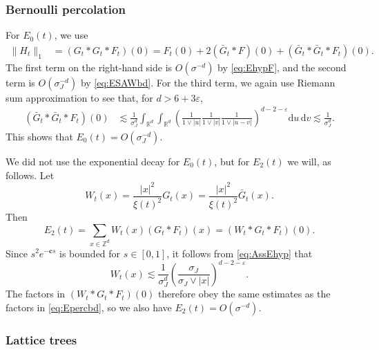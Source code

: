 \documentclass[11pt,a4paper]{article}
\numberwithin{equation}{section}
\theoremstyle{plain}
\theoremstyle{definition}
\newcommand\1{\mathds{1}}
\newcommand\bfc{\mathbf{c}}
\begin{document}
\subsubsection{Bernoulli percolation}

For $E_0(t)$, we use
\begin{align}
    \|H_t\|_1 & = (G_t*G_t*F_t)(0) = F_t(0) + 2(\bar G_t*F)(0) + (\bar G_t*\bar G_t*F_t)(0).
\end{align}
The first term on the right-hand side is $O(\sigma^{-d})$ by \eqref{eq:EhypF},
and the second term  is $O(\sigma_J^{-d})$ by \eqref{eq:ESAWbd}.  For the third
term, we again use Riemann sum approximation to see that,
for $d>6+3\varepsilon$,
\begin{align}
\label{eq:Epercbd}
    (\bar G_t* \bar G_t* F_t) (0)
    & \lesssim
    \frac{1}{\sigma_J^d}
    \int_{\mathbb R^d} \int_{\mathbb R^d}\left(
    \frac{1}{1\vee |u|}
    \frac{1}{1\vee |v|}
    \frac{1}{1\vee |u-v|}\right)^{d-2-\varepsilon}
    \mathrm{d}u \, \mathrm{d}v
    \lesssim
    \frac{1}{\sigma_J^d}
    .
\end{align}
This shows that $E_0(t)=O(\sigma_J^{-d})$.

We did not use the exponential decay for $E_0(t)$, but for $E_2(t)$ we will,
as follows.
Let
\begin{equation}
    W_t(x) = \frac{|x|^2}{\xi(t)^2} G_t(x) = \frac{|x|^2}{\xi(t)^2} \bar G_t(x).
\end{equation}
Then
\begin{equation}
    E_2(t) = \sum_{x\in \mathbb Z^d} W_t(x)(G_t*F_t)(x) =(W_t*G_t*F_t)(0).
\end{equation}
Since $s^2e^{-\bfc s}$ is bounded for $s \in [0,1]$, it follows from \eqref{eq:AssEhyp}
that
\begin{equation}
\label{eq:Kexpbd}
    W_t(x) \lesssim
    \frac{1}{\sigma_J^d}
    \left(\frac{\sigma_J}{\sigma_J \vee|x|} \right)^{d-2-\varepsilon}.
\end{equation}
The factors in $(W_t*G_t*F_t)(0)$ therefore obey the same estimates as the factors
in \eqref{eq:Epercbd}, so we also have $E_2(t)=O(\sigma^{-d})$.

\subsubsection{Lattice trees}
\end{document}
